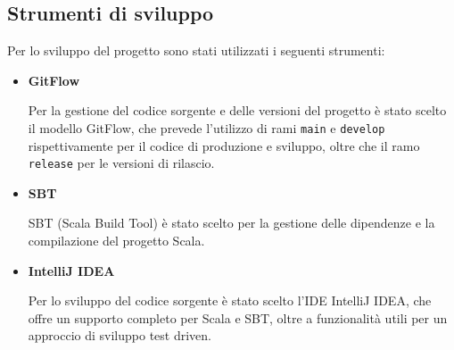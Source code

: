 \subsection{Strumenti di sviluppo} \label{sec:development-process-tools}
Per lo sviluppo del progetto sono stati utilizzati i seguenti strumenti:
\begin{itemize}
    \item \textbf{GitFlow} \par
    Per la gestione del codice sorgente e delle versioni del progetto è stato scelto il modello GitFlow, che prevede l'utilizzo di rami
    \texttt{main} e \texttt{develop} rispettivamente per il codice di produzione e sviluppo, oltre che il ramo \texttt{release} per 
    le versioni di rilascio.
    \item \textbf{SBT} \par
    SBT (Scala Build Tool) è stato scelto per la gestione delle dipendenze e la compilazione del progetto Scala.
    \item \textbf{IntelliJ IDEA} \par
    Per lo sviluppo del codice sorgente è stato scelto l'IDE IntelliJ IDEA, che offre un supporto completo per Scala e SBT, oltre a funzionalità 
    utili per un approccio di sviluppo test driven.
\end{itemize}
